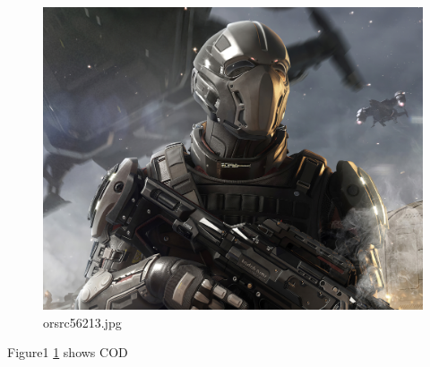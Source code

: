 \documentclass{article}
\begin{document}
\begin{figure}
	\centering
	\caption[A picture]{orsrc56213.jpg}
	\label{fig:orsrc56213}
	\includegraphics[width=\linewidth]{orsrc56213}
\end{figure}
    Figure1 \ref{fig:orsrc56213} shows COD
\end{document}

